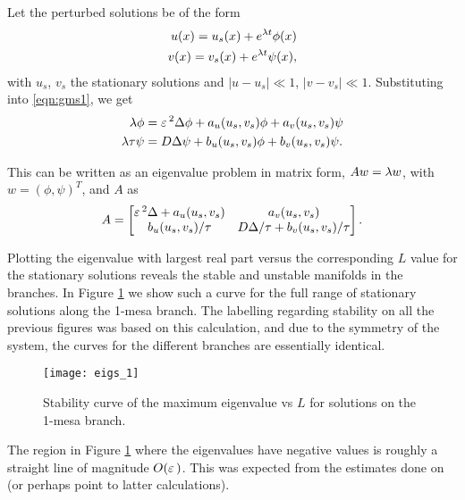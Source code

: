 Let the perturbed solutions be of the form
% 
\begin{equation}
\label{eqn:gms_eigs}
\begin{split}
\begin{aligned}
u(x) = u_s(x) + e^{\lambda t}\phi(x)\\
v(x) = v_s(x) + e^{\lambda t}\psi(x),
\end{aligned}
\end{split}
\end{equation}
% 
with $u_s$, $v_s$ the stationary solutions and $|u-u_s|\ll 1$, $|v-v_s|\ll 1$. Substituting into \eqref{eqn:gms1}, we get
% 
\begin{equation*}
\label{eqn:gms_2}
\begin{split}
\begin{aligned}
	\lambda \phi &= \varepsilon\,^2\Delta \phi + a_u(u_s,v_s)\phi + a_v(u_s,v_s)\psi \\
	\lambda\tau \psi &= D\Delta \psi + b_u(u_s,v_s)\phi + b_v(u_s,v_s)\psi.
\end{aligned}
\end{split}
\end{equation*}

This can be written as an eigenvalue problem in matrix form, $Aw = \lambda w$, with $w = (\phi,\psi)^T$, and $A$ as
% 
\begin{equation}
\label{eqn:Amatrix}
  A =
	\begin{bmatrix}
		\varepsilon\,^2\Delta + a_u(u_s,v_s)& a_v(u_s,v_s) \\
		b_u(u_s,v_s)/\tau& D\Delta/\tau + b_v(u_s,v_s)/\tau
  \end{bmatrix}.
\end{equation}

Plotting the eigenvalue with largest real part versus the corresponding $L$ value for the stationary solutions reveals the stable and unstable manifolds in the branches. In Figure \ref{fig:eigs1} we show such a curve for the full range of stationary solutions along the 1-mesa branch. The labelling regarding stability on all the previous figures was based on this calculation, and due to the symmetry of the system, the curves for the different branches are essentially identical.
% 
\begin{figure}[htb]
\begin{center}
\texttt{[image: eigs\_1]}
\caption{Stability curve of the maximum eigenvalue vs $L$ for solutions on the 1-mesa branch.}
\label{fig:eigs1}
\end{center}
\end{figure}
% 
The region in Figure \ref{fig:eigs1} where the eigenvalues have negative values is roughly a straight line of magnitude $O(\varepsilon\,)$. This was expected from the estimates done on \cite{kolokolnikov_spot_2009} (or perhaps point to latter calculations).

